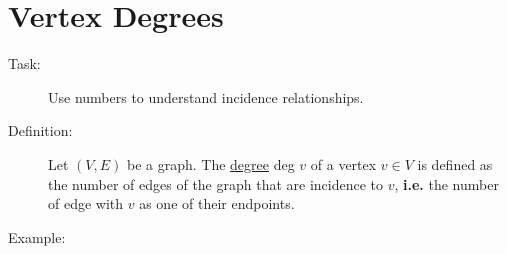 \documentclass[10pt]{article}
\begin{document}
	\section{Vertex Degrees}
	\begin{description}
		\item[Task:] Use numbers to understand incidence relationships.
		\item[Definition:] Let $(V, E)$ be a graph. The \underline{degree} deg $v$ of a vertex $v \in V$ is defined as the number of edges of the graph that are incidence to $v$, \textbf{i.e.} the number of edge with $v$ as one of their endpoints.
		\item[Example:] ~\\
		\begin{figure}[h!]
			\centering
\end{figure}
\end{description}
\end{document}
